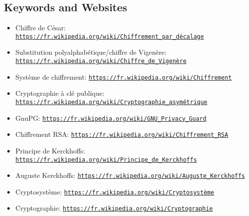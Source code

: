\documentclass[a4paper,11pt]{report}
\newcommand{\BrochureUrlText}[1]{\texttt{#1}}
\begin{document}
{\raggedright

\subsection*{Keywords and Websites}

\begin{itemize}
  \item Chiffre de César: \href{https://fr.wikipedia.org/wiki/Chiffrement_par_d\%C3\%A9calage}{\BrochureUrlText{https://fr.wikipedia.org/wiki/Chiffrement\_par\_décalage}}
  \item Substitution polyalphabétique/chiffre de Vigenère: \href{https://fr.wikipedia.org/wiki/Chiffre_de_Vigen\%C3\%A8re}{\BrochureUrlText{https://fr.wikipedia.org/wiki/Chiffre\_de\_Vigenère}}
  \item Système de chiffrement: \href{https://fr.wikipedia.org/wiki/Chiffrement}{\BrochureUrlText{https://fr.wikipedia.org/wiki/Chiffrement}}
  \item Cryptographie à clé publique: \href{https://fr.wikipedia.org/wiki/Cryptographie_asym\%C3\%A9trique}{\BrochureUrlText{https://fr.wikipedia.org/wiki/Cryptographie\_asymétrique}}
  \item GnuPG: \href{https://fr.wikipedia.org/wiki/GNU_Privacy_Guard}{\BrochureUrlText{https://fr.wikipedia.org/wiki/GNU\_Privacy\_Guard}}
  \item Chiffrement RSA: \href{https://fr.wikipedia.org/wiki/Chiffrement_RSA}{\BrochureUrlText{https://fr.wikipedia.org/wiki/Chiffrement\_RSA}}
  \item Principe de Kerckhoffs: \href{https://fr.wikipedia.org/wiki/Principe_de_Kerckhoffs}{\BrochureUrlText{https://fr.wikipedia.org/wiki/Principe\_de\_Kerckhoffs}}
  \item Auguste Kerckhoffs: \href{https://fr.wikipedia.org/wiki/Auguste_Kerckhoffs}{\BrochureUrlText{https://fr.wikipedia.org/wiki/Auguste\_Kerckhoffs}}
  \item Cryptosystème: \href{https://fr.wikipedia.org/wiki/Cryptosyst\%C3\%A8me}{\BrochureUrlText{https://fr.wikipedia.org/wiki/Cryptosystème}}
  \item Cryptographie: \href{https://fr.wikipedia.org/wiki/Cryptographie}{\BrochureUrlText{https://fr.wikipedia.org/wiki/Cryptographie}}
\end{itemize}


}
\end{document}
